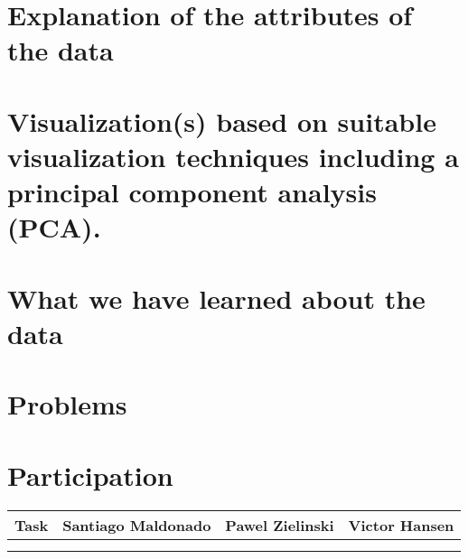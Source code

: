 \documentclass{report}
\begin{document}
\chapter{Explanation of the attributes of the data}
\chapter{Visualization(s) based on suitable visualization techniques including a principal component analysis (PCA).}
\chapter{What we have learned about the data}
\chapter{Problems}
\chapter{Participation}

\begin{table}[H]
\centering
\begin{tabular}{|c|c|l|l|}
\hline
\multicolumn{1}{|l|}{\textbf{Task}} & \multicolumn{1}{l|}{\textbf{Santiago Maldonado}} & \textbf{Pawel Zielinski} & \textbf{Victor Hansen} \\ \hline
                                    &                                                  &                          &                        \\ \hline
                                    &                                                  &                          &                        \\ \hline
\end{tabular}
\end{table}
\end{document}
